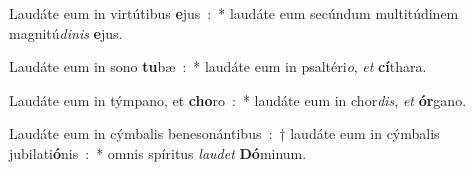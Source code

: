 ﻿\item Laudáte eum in virtútibus \textbf{e}jus~:~* laudáte eum secúndum multitúdinem magnitú\emph{di}\emph{nis} \textbf{e}jus.
\item Laudáte eum in sono \textbf{tu}bæ~:~* laudáte eum in psaltéri\emph{o}, \emph{et} \textbf{cí}thara.
\item Laudáte eum in týmpano, et \textbf{cho}ro~:~* laudáte eum in chor\emph{dis}, \emph{et} \textbf{ór}gano.
\item Laudáte eum in cýmbalis benesonántibus~:~† laudáte eum in cýmbalis jubilati\textbf{ó}nis~:~* omnis spíritus \emph{lau}\emph{det} \textbf{Dó}minum.